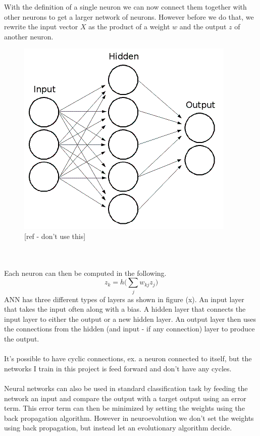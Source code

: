 \documentclass[11pt, a4paper]{article}
\begin{document}
With the definition of a single neuron we can now connect them together with other neurons to get a larger network of neurons. However before we do that, we rewrite the input vector $ X $ as the product of a weight $ w $ and the output $ z $ of another neuron.
\begin{figure}[!ht]
\centering
\includegraphics[scale=0.7]{NeuralNetwork}
\caption{[ref - don't use this]}
\end{figure}
\\
\\
Each neuron can then be computed in the following.
\begin{equation}
z_k = h\Big(\sum\limits_{j}{w_{kj} z_j}\Big)
\end{equation}
ANN has three different types of layers as shown in figure (x). An input layer that takes the input often along with a bias. A hidden layer that connects the input layer to either the output or a new hidden layer. An output layer then uses the connections from the hidden (and input - if any connection) layer to produce the output. 
\\
\\
It's possible to have cyclic connections, ex. a neuron connected to itself, but the networks I train in this project is feed forward and don't have any cycles. 
\\
\\
Neural networks can also be used in standard classification task by feeding the network an input and compare the output with a target output using an error term. This error term can then be minimized by setting the weights using the back propagation algorithm. However in neuroevolution we don't set the weights using back propagation, but instead let an evolutionary algorithm decide.
\end{document}
